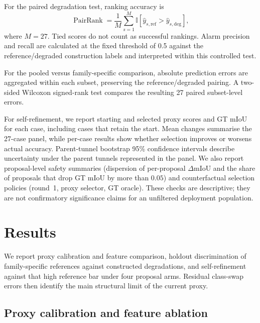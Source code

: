 \documentclass[a4paper,fleqn]{cas-dc}
\begin{document}
{For the paired degradation test, ranking accuracy is
\begin{equation}
\operatorname{PairRank}
=
\frac{1}{M}\sum_{s=1}^{M}
\mathbb{I}
\left[
\hat{y}_{s,\mathrm{ref}}>
\hat{y}_{s,\mathrm{deg}}
\right],
\end{equation}
where $M=27$. Tied scores do not count as successful rankings. Alarm precision and recall are calculated at the fixed threshold of 0.5 against the reference/degraded construction labels and interpreted within this controlled test.

For the pooled versus family-specific comparison, absolute prediction errors are aggregated within each subset, preserving the reference/degraded pairing. A two-sided Wilcoxon signed-rank test compares the resulting 27 paired subset-level errors.

For self-refinement, we report starting and selected proxy scores and GT mIoU for each case, including cases that retain the start. Mean changes summarise the 27-case panel, while per-case results show whether selection improves or worsens actual accuracy. Parent-tunnel bootstrap 95\% confidence intervals describe uncertainty under the parent tunnels represented in the panel. We also report proposal-level safety summaries (dispersion of per-proposal $\Delta$mIoU and the share of proposals that drop GT mIoU by more than $0.05$) and counterfactual selection policies (round~1, proxy selector, GT oracle). These checks are descriptive; they are not confirmatory significance claims for an unfiltered deployment population.

\section{Results}\label{sec:results}

We report proxy calibration and feature comparison, holdout discrimination of family-specific references against constructed degradations, and self-refinement against that high reference bar under four proposal arms. Residual class-swap errors then identify the main structural limit of the current proxy.

\subsection{Proxy calibration and feature ablation}
\label{sec:main-results}
\label{sec:proxy-ablation-results}

}
\end{document}
